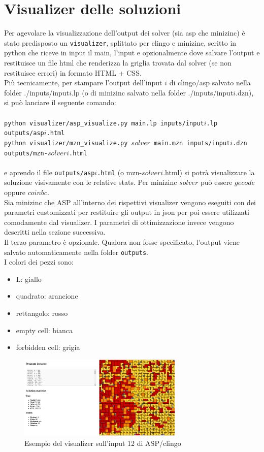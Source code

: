 \documentclass{article}
\begin{document}
\section{Visualizer delle soluzioni}
Per agevolare la visualizzazione dell'output dei solver (sia asp che minizinc) è stato predisposto un \texttt{visualizer}, splittato per clingo e minizinc, scritto in python che riceve in input il main, l'input e opzionalmente dove salvare l'output e restituisce un file html che renderizza la griglia trovata dal solver (se non restituisce errori) in formato HTML + CSS.\\
Più tecnicamente, per stampare l'output dell'input $i$ di clingo/asp salvato nella folder ./inputs/input$i$.lp (o di minizinc salvato nella folder ./inputs/input$i$.dzn), si può lanciare il seguente comando:\\\\
\hspace*{.5cm}\texttt{python visualizer/asp\_visualize.py main.lp inputs/input$i$.lp outputs/asp$i$.html}\\
\hspace*{.5cm}\texttt{python visualizer/mzn\_visualize.py $solver$ main.mzn inputs/input$i$.dzn outputs/mzn-$solver$$i$.html}\\\\
e aprendo il file \texttt{outputs/asp$i$.html} (o mzn-$solver$$i$.html) si potrà visualizzare la soluzione visivamente con le relative stats. Per minizinc $solver$ può essere $gecode$ oppure $coinbc$.\\
Sia minizinc che ASP all'interno dei rispettivi visualizer vengono eseguiti con dei parametri customizzati per restituire gli output in json per poi essere utilizzati comodamente dal visualizer. I parametri di ottimizzazione invece vengono descritti nella sezione successiva.\\
Il terzo parametro è opzionale. Qualora non fosse specificato, l'output viene salvato automaticamente nella folder \texttt{outputs}.\\
I colori dei pezzi sono: 
\begin{itemize}
    \item L: giallo
    \item quadrato: arancione
    \item rettangolo: rosso
    \item empty cell: bianca
    \item forbidden cell: grigia
\end{itemize}
\begin{figure}[ht!]
    \centering
    \includegraphics[width=0.7\textwidth]{images/visualizer.png}
    \caption{Esempio del visualizer sull'input 12 di ASP/clingo}
\end{figure}
\end{document}
